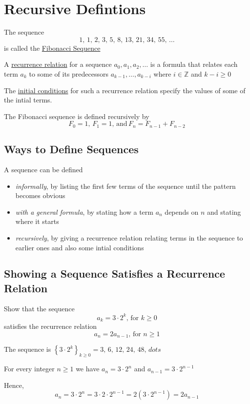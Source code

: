 \section{Recursive Defintions}
\begin{example}
    The sequence $$1,\,1,\,2,\,3,\,5,\,8,\,13,\,21,\,34,\,55,\,\dots$$ is called the \underline{Fibonacci Sequence}
\end{example}

\begin{definition}
    A \underline{recurrence relation} for a sequence $a_0,a_1,a_2,\dots$ is a formula that relates each term $a_k$ to some of its predecessors $a_{k-1},\dots,a_{k-i}$ where $i\in\mathbb Z$ and $k-i \geq 0$

    The \underline{initial conditions} for such a recurrence relation specify the values of some of the intial terms.
\end{definition}

\begin{example}
The Fibonacci sequence is defined recursively by $$F_0 = 1,\, F_1 = 1,\,\text{and}\,F_n = F_{n-1} + F_{n-2}$$
\end{example}

\subsection{Ways to Define Sequences}
A sequence can be defined
\begin{itemize}
    \item \emph{informally}, by listing the first few terms of the sequence until the pattern becomes obvious
    \item \emph{with a general formula}, by stating how a term $a_n$ depends on $n$ and stating where it starts
    \item \emph{recursively}, by giving a recurrence relation relating terms in the sequence to earlier ones and also some intial conditions
\end{itemize}

\subsection{Showing a Sequence Satisfies a Recurrence Relation}
\begin{example}
Show that the sequence $$a_k = 3\cdot 2^k,\,\text{for }k\geq 0$$ satisfies the recurrence relation $$a_n = 2a_{n-1},\,\text{for }n\geq 1$$

The sequence is $\displaystyle \left\{3\cdot 2^k\right\}_{k\geq 0} = 3,\,6,\,12,\,24,\,48,\,dots$

For every integer $n\geq 1$ we have $a_n = 3\cdot 2^n$ and $a_{n-1} = 3\cdot 2^{n-1}$

Hence, $$a_n = 3\cdot 2^n = 3\cdot 2\cdot 2^{n-1} = 2 (3\cdot 2^{n-1}) = 2 a_{n-1}$$
\end{example}

